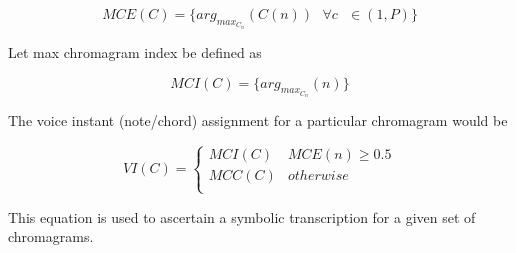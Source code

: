 \begin{equation}
MCE(C) = \{arg_{max_{C_n}}(C(n)) \ \ \ \forall c \ \ \ \in (1, P) \}
\end{equation}

\noindent Let max chromagram index be defined as

\begin{equation}
MCI(C) = \{arg_{max_{C_n}}(n)\}
\end{equation}

\noindent The voice instant (note/chord) assignment for a particular chromagram would be 

\begin{equation} \label{eq:VI}
VI(C) = \begin{cases}
      MCI(C) & MCE(n) \geq 0.5 \\
      MCC(C) & otherwise \\  \end{cases}
\end{equation}

\noindent This equation is used to ascertain a symbolic transcription for a given set of chromagrams. 